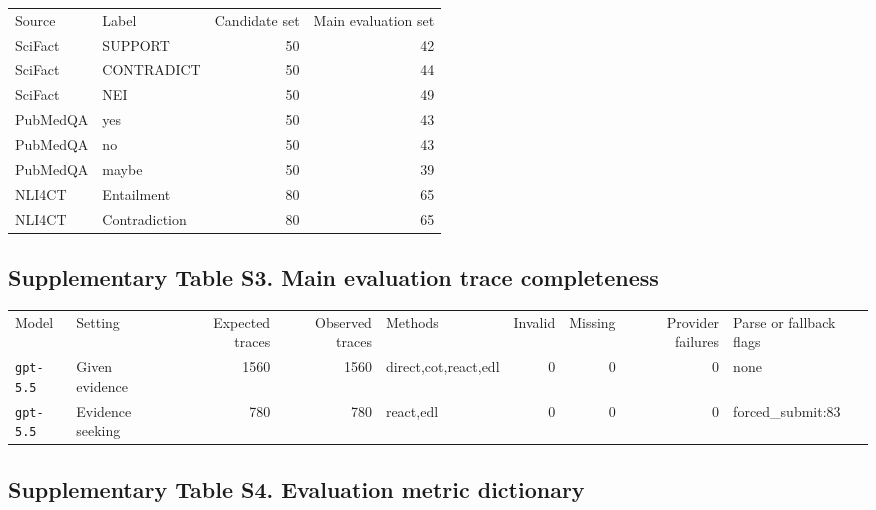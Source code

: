 \documentclass[
  8pt,
]{extarticle}
\begin{document}
\begin{center}
\begin{adjustbox}{max width=0.95\textwidth}
\begin{tabular}{@{}
llrr@{}}
\toprule\noalign{}
Source & Label & Candidate set & Main evaluation set \\

SciFact & SUPPORT & 50 & 42 \\
SciFact & CONTRADICT & 50 & 44 \\
SciFact & NEI & 50 & 49 \\
PubMedQA & yes & 50 & 43 \\
PubMedQA & no & 50 & 43 \\
PubMedQA & maybe & 50 & 39 \\
NLI4CT & Entailment & 80 & 65 \\
NLI4CT & Contradiction & 80 & 65 \\
\bottomrule
\end{tabular}
\end{adjustbox}
\end{center}

\hypertarget{supplementary-table-s3-main-evaluation-trace-completeness}{%
\subsection{Supplementary Table S3. Main evaluation trace
completeness}\label{supplementary-table-s3-main-evaluation-trace-completeness}}

\begin{center}
\begin{adjustbox}{max width=0.95\textwidth}
\begin{tabular}{@{}
llrrlrrrl@{}}
\toprule\noalign{}
Model & Setting & Expected traces & Observed traces & Methods & Invalid
& Missing & Provider failures & Parse or fallback flags \\

\texttt{gpt-5.5} & Given evidence & 1560 & 1560 & direct,cot,react,edl &
0 & 0 & 0 & none \\
\texttt{gpt-5.5} & Evidence seeking & 780 & 780 & react,edl & 0 & 0 & 0
& forced\_submit:83 \\
\bottomrule
\end{tabular}
\end{adjustbox}
\end{center}

\hypertarget{supplementary-table-s4-evaluation-metric-dictionary}{%
\subsection{Supplementary Table S4. Evaluation metric
dictionary}\label{supplementary-table-s4-evaluation-metric-dictionary}}
\end{document}

